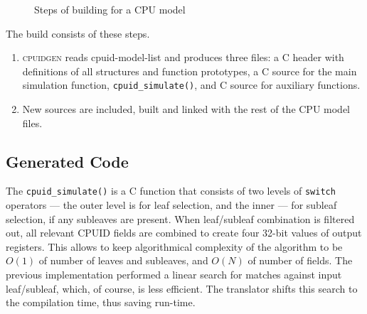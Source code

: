 \documentclass[a4paper,10pt,oneside,unicode]{article}
\newcommand{\cpuidgen}{\textsc{cpuidgen} }
\begin{document}
\begin{figure}[htbp]
\centering
{}
\caption{Steps of building for a CPU model} \label{fig:workflow}
\end{figure} 

The build consists of these steps.
\begin{enumerate}
    \item \cpuidgen reads cpuid-model-list and produces three files: a C header with definitions of all structures and function prototypes, a C source for the main simulation function, \texttt{cpuid\_simulate()}, and C source for auxiliary functions.
    \item New sources are included, built and linked with the rest of the CPU model files.
\end{enumerate}

\subsection{Generated Code}

The \texttt{cpuid\_simulate()} is a C function that consists of two levels of \texttt{switch} operators --- the outer level is for leaf selection, and the inner --- for subleaf selection, if any subleaves are present. When leaf/subleaf combination is filtered out, all relevant CPUID fields are combined to create four 32-bit values of output registers. This allows to keep algorithmical complexity of the algorithm to be $O(1)$ of number of leaves and subleaves, and $O(N)$ of number of fields. The previous implementation performed a linear search for matches against input leaf/subleaf, which, of course, is less efficient. The translator shifts this search to the compilation time, thus saving run-time.
\end{document}
